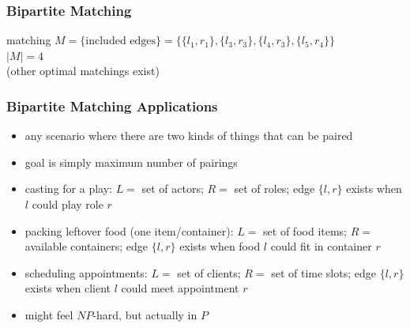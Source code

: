 \documentclass{beamer}
\begin{document}
\begin{frame} \frametitle{Bipartite Matching}
\begin{center}

  matching $M = \{\text{included edges}\}
    = \{ \{l_1, r_1\}, \{l_3, r_3\}, \{l_4, r_3\}, \{l_5, r_4\} \}$ \\

    $|M|=4$ \\

    (other optimal matchings exist)
\end{center}
\end{frame}

\begin{frame} \frametitle{Bipartite Matching Applications}
\begin{itemize}
  \item any scenario where there are two kinds of things that can be paired
  \item goal is simply maximum number of pairings
  \item casting for a play: $L = $ set of actors; $R = $ set of roles;
    edge $\{l, r\}$ exists when $l$ could play role $r$
  \item packing leftover food (one item/container): $L = $ set of food items; $R = $ available
    containers; edge $\{l, r\}$ exists when food $l$ could fit in container $r$
  \item scheduling appointments: $L = $ set of clients; $R = $ set of time slots;
    edge $\{l, r \}$ exists when client $l$ could meet appointment $r$
  \item might feel $NP$-hard, but actually in $P$
\end{itemize}
\end{frame}
\end{document}
